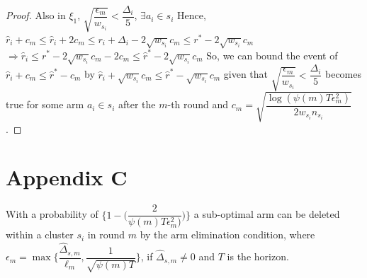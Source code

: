 \begin{proof}
\newline Also in $\xi_{1}$, $\sqrt{\dfrac{\epsilon_{m}}{w_{s_{i}}}}<\dfrac{\Delta_{i}}{5}$, $\exists a_{i}\in s_{i}$
\newline Hence, $\hat{r}_{i}+c_{m}\leq \hat{r}_{i}+2c_{m}\leq r_{i} + \Delta_{i} - 2\sqrt{w_{s_{i}}}c_{m}\leq r^{*} - 2\sqrt{w_{s_{i}}}c_{m}$
\newline $\Rightarrow \hat{r}_{i} \leq {r}^{*} - 2\sqrt{w_{s_{i}}}c_{m} - 2c_{m} \leq \hat{r}^{*} - 2\sqrt{w_{s_{i}}}c_{m}$
\newline So, we can bound the event of $\hat{r}_{i}+c_{m}\leq \hat{r}^{*}-c_{m}$ by $\hat{r}_{i} + \sqrt{w_{s_{i}}}c_{m} \leq \hat{r}^{*} - \sqrt{w_{s_{i}}}c_{m}$ given that $\sqrt{\dfrac{\epsilon_{m}}{w_{s_{i}}}}<\dfrac{\Delta_{i}}{5}$ becomes true for some arm $a_{i}\in s_{i}$ after the $m$-th round and $c_{m}=\sqrt{\dfrac{\log (\psi(m)T\epsilon_{m}^{2})}{2w_{s_{i}} n_{s_{i}}}}$.
\end{proof}

\section*{Appendix C}
\begin{proposition}
With a probability of $\bigg\lbrace 1-\bigg(\dfrac{2}{\psi(m)T\epsilon_{m}^{2})}\bigg)\bigg\rbrace$ a sub-optimal arm can be deleted within a cluster $s_{i}$ in round $m$ by the arm elimination condition, where $\epsilon_{m}=\max{\bigg\lbrace\dfrac{\hat{\Delta}_{s,m}}{\ell_{m}}, \dfrac{1}{\sqrt{\psi{(m)T}}}\bigg\rbrace}$, if $\hat{\Delta}_{s,m}\neq 0$ and $T$ is the horizon.
\end{proposition}

